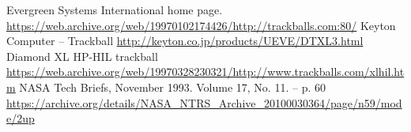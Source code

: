 \documentclass[11pt, a4paper]{article}
\begin{document}
\begin{thebibliography}{9}
 Evergreen Systems International home page. \url{https://web.archive.org/web/19970102174426/http://trackballs.com:80/}
 Keyton Computer -- Trackball \url{http://keyton.co.jp/products/UEVE/DTXL3.html}
 Diamond XL HP-HIL trackball \url{https://web.archive.org/web/19970328230321/http://www.trackballs.com/xlhil.htm}
 NASA Tech Briefs, November 1993. Volume 17, No. 11. -- p. 60 \url{https://archive.org/details/NASA_NTRS_Archive_20100030364/page/n59/mode/2up}
\end{thebibliography}
\end{document}
